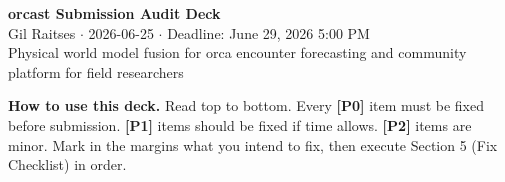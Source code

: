 \documentclass[10pt]{article}
\begin{document}
\begin{center}
{\Large\bfseries orcast Submission Audit Deck}\\[0.4em]
{\normalsize Gil Raitses $\cdot$ 2026-06-25 $\cdot$ Deadline: June 29, 2026 5:00 PM}\\[0.2em]
{\small Physical world model fusion for orca encounter forecasting and community platform for field researchers}
\end{center}

\vspace{0.5em}
\begin{notebox}
\textbf{How to use this deck.} Read top to bottom. Every \textbf{\textcolor{P0red}{[P0]}} item must be fixed before submission. \textbf{\textcolor{P1amber}{[P1]}} items should be fixed if time allows. \textbf{\textcolor{P2gray}{[P2]}} items are minor. Mark in the margins what you intend to fix, then execute Section 5 (Fix Checklist) in order.
\end{notebox}

\tableofcontents
\newpage


\newpage

\newpage

\newpage

\newpage

\end{document}
